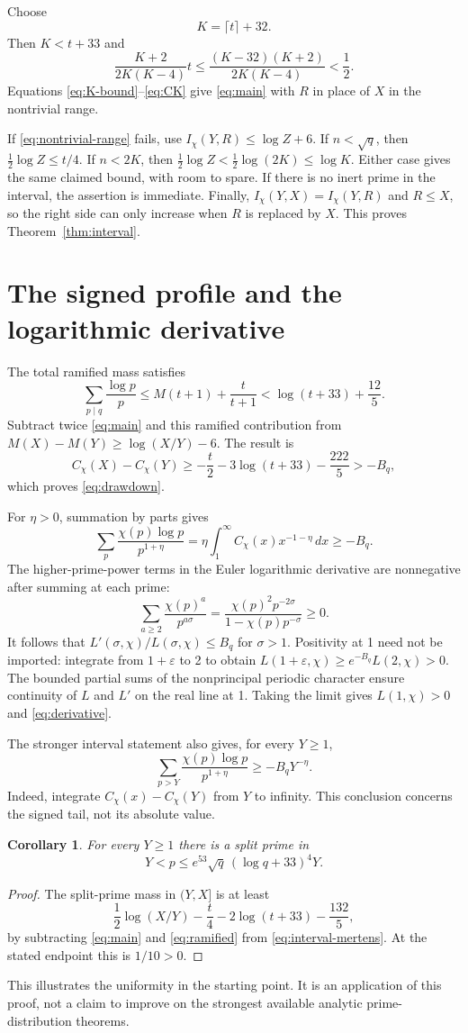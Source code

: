 \documentclass[11pt]{article}
\newtheorem{corollary}[theorem]{Corollary}
\begin{document}
Choose
\[
 K=\lceil t\rceil+32.
\]
Then $K<t+33$ and
\[
 \frac{K+2}{2K(K-4)}t
 \le\frac{(K-32)(K+2)}{2K(K-4)}<\frac12.
\]
Equations \eqref{eq:K-bound}--\eqref{eq:CK} give
\eqref{eq:main} with $R$ in place of $X$ in the nontrivial range.

If \eqref{eq:nontrivial-range} fails, use
$I_\chi(Y,R)\le\log Z+6$. If $n<\sqrt q$, then
$\frac12\log Z\le t/4$. If $n<2K$, then
$\frac12\log Z<\frac12\log(2K)\le\log K$. Either case gives
the same claimed bound, with room to spare. If there is no inert
prime in the interval, the assertion is immediate. Finally,
$I_\chi(Y,X)=I_\chi(Y,R)$ and $R\le X$, so the right side can
only increase when $R$ is replaced by $X$. This proves
Theorem~\ref{thm:interval}.

\section{The signed profile and the logarithmic derivative}
The total ramified mass satisfies
\begin{equation}\label{eq:ramified}
 \sum_{p\mid q}\frac{\log p}{p}
 \le M(t+1)+\frac{t}{t+1}
 <\log(t+33)+\frac{12}{5}.
\end{equation}
Subtract twice \eqref{eq:main} and this ramified contribution from
$M(X)-M(Y)\ge\log(X/Y)-6$. The result is
\[
 C_\chi(X)-C_\chi(Y)
 \ge-\frac t2-3\log(t+33)-\frac{222}{5}>-B_q,
\]
which proves \eqref{eq:drawdown}.

For $\eta>0$, summation by parts gives
\[
 \sum_p\frac{\chi(p)\log p}{p^{1+\eta}}
 =\eta\int_1^\infty C_\chi(x)x^{-1-\eta}\,dx\ge-B_q.
\]
The higher-prime-power terms in the Euler logarithmic derivative are
nonnegative after summing at each prime:
\[
 \sum_{a\ge2}\frac{\chi(p)^a}{p^{a\sigma}}
 =\frac{\chi(p)^2p^{-2\sigma}}{1-\chi(p)p^{-\sigma}}\ge0.
\]
It follows that $L'(\sigma,\chi)/L(\sigma,\chi)\le B_q$ for
$\sigma>1$. Positivity at 1 need not be imported: integrate from
$1+\varepsilon$ to 2 to obtain
$L(1+\varepsilon,\chi)\ge e^{-B_q}L(2,\chi)>0$.
The bounded partial sums of the nonprincipal periodic character
ensure continuity of $L$ and $L'$ on the real line at 1.
Taking the limit gives $L(1,\chi)>0$ and \eqref{eq:derivative}.

The stronger interval statement also gives, for every $Y\ge1$,
\[
 \sum_{p>Y}\frac{\chi(p)\log p}{p^{1+\eta}}
 \ge-B_qY^{-\eta}.
\]
Indeed, integrate $C_\chi(x)-C_\chi(Y)$ from $Y$ to infinity.
This conclusion concerns the signed tail, not its absolute value.

\begin{corollary}\label{cor:split-gap}
For every $Y\ge1$ there is a split prime in
\[
 Y<p\le e^{53}\sqrt q\,(\log q+33)^4Y.
\]
\end{corollary}
\begin{proof}
The split-prime mass in $(Y,X]$ is at least
\[
 \frac12\log(X/Y)-\frac t4-2\log(t+33)-\frac{132}{5},
\]
by subtracting \eqref{eq:main} and \eqref{eq:ramified} from
\eqref{eq:interval-mertens}. At the stated endpoint this is $1/10>0$.
\end{proof}
This illustrates the uniformity in the starting point. It is an
application of this proof, not a claim to improve on the strongest
available analytic prime-distribution theorems.
\end{document}
